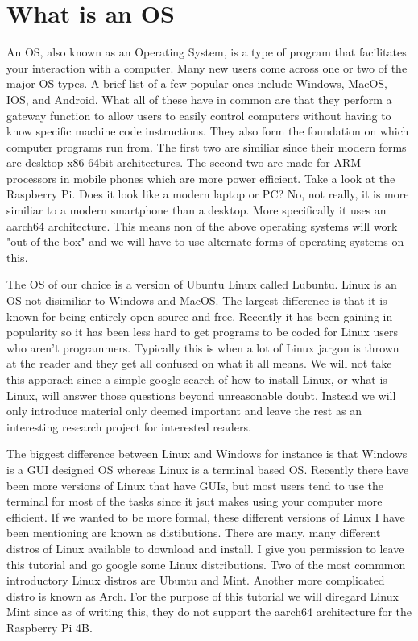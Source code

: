 \documentclass[letterpaper,12pt,notitlepage]{report} %
\begin{document}
\section{What is an OS}
An OS, also known as an Operating System, is a type of program that facilitates your interaction with a computer. Many new users come across one or two of the major OS types. A brief list of a few popular ones include Windows, MacOS, IOS, and Android. What all of these have in common are that they perform a gateway function to allow users to easily control computers without having to know specific machine code instructions. They also form the foundation on which computer programs run from. The first two are similiar since their modern forms are desktop x86 64bit architectures. The second two are made for ARM processors in mobile phones which are more power efficient. Take a look at the Raspberry Pi. Does it look like a modern laptop or PC? No, not really, it is more similiar to a modern smartphone than a desktop. More specifically it uses an aarch64 architecture. This means non of the above operating systems will work "out of the box" and we will have to use alternate forms of operating systems on this.

The OS of our choice is a version of Ubuntu Linux called Lubuntu. Linux is an OS not disimiliar to Windows and MacOS. The largest difference is that it is known for being entirely open source and free. Recently it has been gaining in popularity so it has been less hard to get programs to be coded for Linux users who aren't programmers. Typically this is when a lot of Linux jargon is thrown at the reader and they get all confused on what it all means. We will not take this apporach since a simple google search of how to install Linux, or what is Linux, will answer those questions beyond unreasonable doubt. Instead we will only introduce material only deemed important and leave the rest as an interesting research project for interested readers. 

The biggest difference between Linux and Windows for instance is that Windows is a GUI designed OS whereas Linux is a terminal based OS. Recently there have been more versions of Linux that have GUIs, but most users tend to use the terminal for most of the tasks since it jsut makes using your computer more efficient. If we wanted to be more formal, these different versions of Linux I have been mentioning are known as distibutions. There are many, many different distros of Linux available to download and install. I give you permission to leave this tutorial and go google some Linux distributions. Two of the most commmon introductory Linux distros are Ubuntu and Mint. Another more complicated distro is known as Arch. For the purpose of this tutorial we will diregard Linux Mint since as of writing this, they do not support the aarch64 architecture for the Raspberry Pi 4B. 
\end{document}
